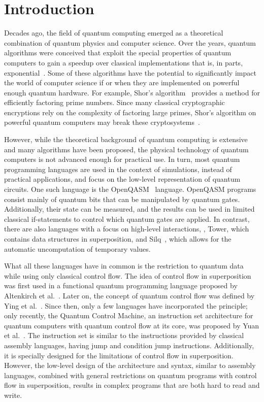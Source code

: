 \chapter{Introduction}
\label{ch:introduction}
Decades ago, the field of quantum computing emerged as a theoretical combination of quantum physics and computer science. Over the years, quantum algorithms were conceived that exploit the special properties of quantum computers to gain a speedup over classical implementations that is, in parts, exponential~\cite{BeVa93}. Some of these algorithms have the potential to significantly impact the world of computer science if or when they are implemented on powerful enough quantum hardware. For example, Shor's algorithm~\cite{Shor97} provides a method for efficiently factoring prime numbers. Since many classical cryptographic encryptions rely on the complexity of factoring large primes, Shor's algorithm on powerful quantum computers may break these cryptosystems~\cite{DiCh20}.

However, while the theoretical background of quantum computing is extensive and many algorithms have been proposed, the physical technology of quantum computers is not advanced enough for practical use. In turn, most quantum programming languages are used in the context of simulations, instead of practical applications, and focus on the low-level representation of quantum circuits. One such language is the OpenQASM~\cite{CBSG17} language. OpenQASM programs consist mainly of quantum bits that can be manipulated by quantum gates. Additionally, their state can be measured, and the results can be used in limited classical if-statements to control which quantum gates are applied. In contrast, there are also languages with a focus on high-level interactions, \eg, Tower\cite{YuCa22}, which contains data structures in superposition, and Silq~\cite{BBGV20}, which allows for the automatic uncomputation of temporary values.

What all these languages have in common is the restriction to quantum data while using only classical control flow. The idea of control flow in superposition was first used in a functional quantum programming language proposed by Altenkirch et al.~\cite{AlGr05}. Later on, the concept of quantum control flow was defined by Ying et al.~\cite{YYF12}. Since then, only a few languages have incorporated the principle; only recently, the Quantum Control Machine, an instruction set architecture for quantum computers with quantum control flow at its core, was proposed by Yuan et al.~\cite{YVC24}.
The instruction set is similar to the instructions provided by classical assembly languages, having jump and condition jump instructions. Additionally, it is specially designed for the limitations of control flow in superposition. However, the low-level design of the architecture and syntax, similar to assembly languages, combined with general restrictions on quantum programs with control flow in superposition, results in complex programs that are both hard to read and write.

